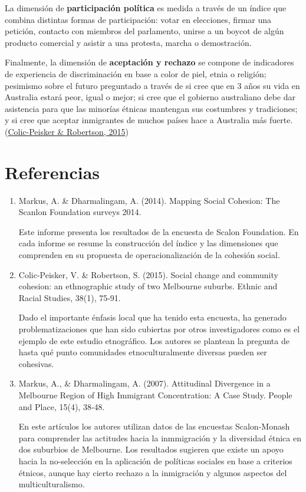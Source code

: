 \documentclass[
  12pt,
]{book}
\begin{document}
La dimensión de \textbf{participación política} es medida a través de un índice que combina distintas formas de participación: votar en elecciones, firmar una petición, contacto con miembros del parlamento, unirse a un boycot de algún producto comercial y asistir a una protesta, marcha o demostración.

Finalmente, la dimensión de \textbf{aceptación y rechazo} se compone de indicadores de experiencia de discriminación en base a color de piel, etnia o religión; pesimismo sobre el futuro preguntado a través de si cree que en 3 años su vida en Australia estará peor, igual o mejor; si cree que el gobierno australiano debe dar asistencia para que las minorías étnicas mantengan sus costumbres y tradiciones; y si cree que aceptar inmigrantes de muchos países hace a Australia más fuerte. (\protect\hyperlink{ref-colic-peisker_Social_2015}{Colic-Peisker \& Robertson, 2015})

\hypertarget{referencias-1}{%
\section{Referencias}\label{referencias-1}}

\begin{enumerate}
\def\labelenumi{\arabic{enumi}.}
\item
  Markus, A. \& Dharmalingam, A. (2014). Mapping Social Cohesion: The
  Scanlon Foundation surveys 2014.

  Este informe presenta los resultados de la encuesta de Scalon Foundation. En cada informe se resume la construcción del índice y las dimensiones que comprenden en su propuesta de operacionalización de la cohesión social.
\item
  Colic-Peisker, V. \& Robertson, S. (2015). Social change and
  community cohesion: an ethnographic study of two Melbourne suburbs.
  Ethnic and Racial Studies, 38(1), 75-91.

  Dado el importante énfasis local que ha tenido esta encuesta, ha
  generado problematizaciones que han sido cubiertas por otros
  investigadores como es el ejemplo de este estudio etnográfico. Los
  autores se plantean la pregunta de hasta qué punto comunidades
  etnoculturalmente diversas pueden ser cohesivas.
\item
  Markus, A., \& Dharmalingam, A. (2007). Attitudinal Divergence in a
  Melbourne Region of High Immigrant Concentration: A Case Study.
  People and Place, 15(4), 38-48.

  En este artículos los autores utilizan datos de las encuestas
  Scalon-Monash para comprender las actitudes hacia la inmmigración y
  la diversidad étnica en dos suburbios de Melbourne. Los resultados
  sugieren que existe un apoyo hacia la no-selección en la aplicación
  de políticas sociales en base a criterios étnicos, aunque hay cierto
  rechazo a la inmigración y algunos aspectos del multiculturalismo.
\end{enumerate}
\end{document}
